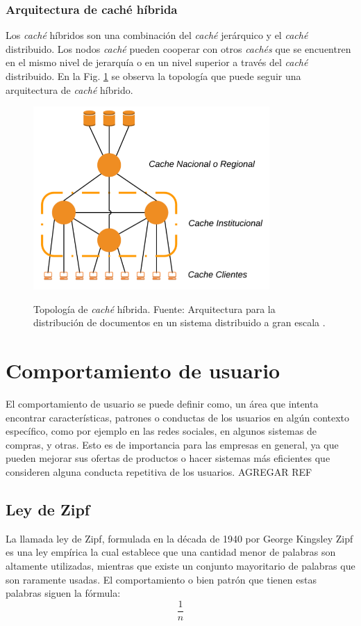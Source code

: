 \documentclass[12pt]{ociamthesis}  %
\begin{document}
\subsubsection{Arquitectura de caché híbrida}
Los \textit{caché} híbridos son una combinación del \textit{caché} jerárquico y el \textit{caché} distribuido. Los nodos \textit{caché} pueden cooperar con otros \textit{cachés} que se encuentren en el mismo nivel de jerarquía o en un nivel superior a través del \textit{caché} distribuido. En la Fig. \ref{topologia_cache_hibrido} se observa la topología que puede seguir una arquitectura de \textit{caché} híbrido.

\begin{figure}[!htb]
	\centering
	\includegraphics[width=9cm]{Imagenes/Topologia_cache_hibrida}\\
	\caption{Topología de \textit{caché} híbrida. Fuente: Arquitectura para la distribución de documentos en un sistema distribuido a gran escala \cite{sosa2002arquitectura}.}
	\label{topologia_cache_hibrido}
\end{figure}

\pagebreak
\section{Comportamiento de usuario}

El comportamiento de usuario se puede definir como, un área que intenta encontrar características, patrones o conductas de los usuarios en algún contexto específico, como por ejemplo en las redes sociales, en algunos sistemas de compras, y otras. Esto es de importancia para las empresas en general, ya que pueden mejorar sus ofertas de productos o hacer sistemas más eficientes que consideren alguna conducta repetitiva de los usuarios. AGREGAR REF

\subsection{Ley de Zipf}
La llamada ley de Zipf, formulada en la década de 1940 por George Kingsley Zipf \cite{zipf2013psycho}\cite{zipf2016human} es una ley empírica la cual establece que una cantidad menor de palabras son altamente utilizadas, mientras que existe un conjunto mayoritario de palabras que son raramente usadas. El comportamiento o bien patrón que tienen estas palabras siguen la fórmula:\\
\begin{equation}
\frac{1}{n}
\end{equation}\\
\end{document}

